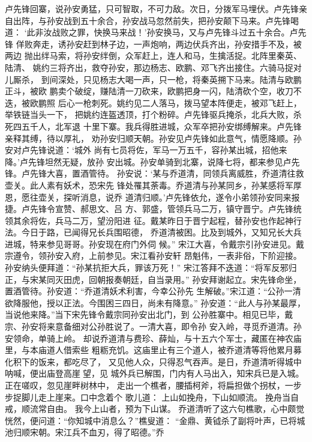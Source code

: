 卢先锋回寨，说孙安勇猛，只可智取，不可力敌。次日，分拨军马埋伏。卢先锋亲
自出阵，与孙安战到五十余合，孙安战马忽然前失，把孙安颠下马来。卢先锋喝道：
‘此非汝战败之罪，快换马来战！’孙安换马，又与卢先锋斗过五十余合。卢先锋
佯败奔走，诱孙安赶到林子边，一声炮响，两边伏兵齐出，孙安措手不及，被两边
抛出绊马索，将孙安绊倒，众军赶上，连人和马，生擒活捉。北阵里秦英、陆清、
姚约三将齐出，救夺孙安，那边杨志、欧鹏、邓飞齐出接住。六骑马捉对儿厮杀，
到间深处，只见杨志大喝一声，只一枪，将秦英搠下马来。陆清与欧鹏正斗，被欧
鹏卖个破绽，赚陆清一刀砍来，欧鹏把身一闪，陆清砍个空，收刀不迭，被欧鹏照
后心一枪刺死。姚约见二人落马，拨马望本阵便走，被邓飞赶上，举铁链当头一下，
把姚约连盔透顶，打个粉碎。卢先锋驱兵掩杀，北兵大败，杀死四五千人，北军退
十里下寨。我兵得胜进城，众军卒把孙安绑缚解来。卢先锋亲释其缚，待以厚礼，
劝孙安归顺天朝。孙安见卢先锋如此意气，情愿降顺。孙安对卢先锋说道：‘城外
尚有七员将佐，军马一万五千，容孙某出城，招他来降。’卢先锋坦然无疑，放孙
安出城。孙安单骑到北寨，说降七将，都来参见卢先锋。卢先锋大喜，置酒管待。
孙安说：‘某与乔道清，同领兵离威胜，乔道清往救壶关。此人素有妖术，恐宋先
锋处罹其荼毒。乔道清与孙某同乡，孙某感将军厚恩，愿往壶关，探听消息，说乔
道清归顺。’卢先锋依允，遂令小弟领孙安同来报捷。卢先锋令宣赞、郝思文、吕
方、郭盛，管领兵马二万，镇守晋宁。卢先锋统领其余将佐，兵马二万，望汾阳进
征。戴某昨日于晋宁起程，替孙安也作起神行法。今日于路，已闻得兄长兵围昭德，
乔道清被困。比及到城外，又知兄长大兵进城，特来参见哥哥。孙安现在府门外伺
候。”
宋江大喜，令戴宗引孙安进见。戴宗遵令，领孙安入府，上前参见。宋江看孙安轩
昂魁伟，一表非俗，下阶迎接。孙安纳头便拜道：“孙某抗拒大兵，罪该万死！”
宋江答拜不迭道：“将军反邪归正，与宋某同灭田虎，回朝报奏朝廷，自当录用。”
孙安拜谢起立。宋先锋命坐，置酒管待。孙安道：“乔道清妖术利害，今幸公孙先
生解破。”宋江道：“公孙一清欲降服他，授以正法。今围困三四日，尚未有降意。”
孙安道：“此人与孙某最厚，当说他来降。”当下宋先锋令戴宗同孙安出北门，到
公孙胜寨中。相见已毕，戴宗、孙安将来意备细对公孙胜说了。一清大喜，即令孙
安入岭，寻觅乔道清。孙安领命，单骑上岭。
却说乔道清与费珍、薛灿，与十五六个军士，藏匿在神农庙里，与本庙道人借索些
粗粝充饥。这庙里止有三个道人，被乔道清等将他累月募化积下的饭来，都吃尽了，
又见他人众，只得忍气吞声。是日，乔道清听得城中呐喊，便出庙登高崖望，见
城外兵已解围，门内有人马出入，知宋兵已是入城。正在嗟叹，忽见崖畔树林中，
走出一个樵者，腰插柯斧，将扁担做个拐杖，一步步捉脚儿走上崖来。口中念着个
歌儿道：
上山如挽舟，下山如顺流。
挽舟当自戒，顺流常自由。
我今上山者，预为下山谋。
乔道清听了这六句樵歌，心中颇觉恍然，便问道：“你知城中消息么？”樵叟道：
“金鼎、黄钺杀了副将叶声，已将城池归顺宋朝。宋江兵不血刃，得了昭德。”乔
